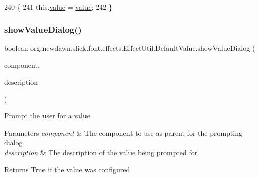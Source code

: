 \begin{DoxyCode}
240                                             \{
241             this.\mbox{\hyperlink{classorg_1_1newdawn_1_1slick_1_1font_1_1effects_1_1_effect_util_1_1_default_value_a0bc4a9aca1a1dd586fe8580d9e68c8fd}{value}} = \mbox{\hyperlink{classorg_1_1newdawn_1_1slick_1_1font_1_1effects_1_1_effect_util_1_1_default_value_a0bc4a9aca1a1dd586fe8580d9e68c8fd}{value}};
242         \}
\end{DoxyCode}
\mbox{\label{classorg_1_1newdawn_1_1slick_1_1font_1_1effects_1_1_effect_util_1_1_default_value_a8f552a6acac2b51815b404750664b8d6}} 
\subsubsection{\texorpdfstring{show\+Value\+Dialog()}{showValueDialog()}}
{\footnotesize\ttfamily boolean org.\+newdawn.\+slick.\+font.\+effects.\+Effect\+Util.\+Default\+Value.\+show\+Value\+Dialog (\begin{DoxyParamCaption}\item[{final J\+Component}]{component,  }\item[{String}]{description }\end{DoxyParamCaption})\hspace{0.3cm}{\ttfamily [inline]}}

Prompt the user for a value


\begin{DoxyParams}{Parameters}
{\em component} & The component to use as parent for the prompting dialog \\
\hline
{\em description} & The description of the value being prompted for \\
\hline
\end{DoxyParams}
\begin{DoxyReturn}{Returns}
True if the value was configured 
\end{DoxyReturn}

